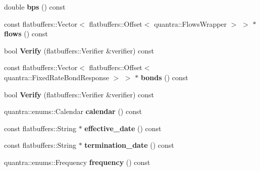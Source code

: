 \begin{DoxyCompactItemize}
double {\bfseries bps} () const
\item 
\mbox{\label{structquantra_1_1FLATBUFFERS__FINAL__CLASS_aadf140966c400eb42ab77cc5049538a0}} 
const flatbuffers\+::\+Vector$<$ flatbuffers\+::\+Offset$<$ quantra\+::\+Flows\+Wrapper $>$ $>$ $\ast$ {\bfseries flows} () const
\item 
\mbox{\label{structquantra_1_1FLATBUFFERS__FINAL__CLASS_aed693ee5a45b5f53af7411f9cab6793a}} 
bool {\bfseries Verify} (flatbuffers\+::\+Verifier \&verifier) const
\item 
\mbox{\label{structquantra_1_1FLATBUFFERS__FINAL__CLASS_a12e5ea116142db128ca4e889ac5c752b}} 
const flatbuffers\+::\+Vector$<$ flatbuffers\+::\+Offset$<$ quantra\+::\+Fixed\+Rate\+Bond\+Response $>$ $>$ $\ast$ {\bfseries bonds} () const
\item 
\mbox{\label{structquantra_1_1FLATBUFFERS__FINAL__CLASS_aed693ee5a45b5f53af7411f9cab6793a}} 
bool {\bfseries Verify} (flatbuffers\+::\+Verifier \&verifier) const
\item 
\mbox{\label{structquantra_1_1FLATBUFFERS__FINAL__CLASS_a22bef2961bc16a42406e7b6c3d62a33e}} 
quantra\+::enums\+::\+Calendar {\bfseries calendar} () const
\item 
\mbox{\label{structquantra_1_1FLATBUFFERS__FINAL__CLASS_a122143580b74bd04c6b38d31044c9836}} 
const flatbuffers\+::\+String $\ast$ {\bfseries effective\+\_\+date} () const
\item 
\mbox{\label{structquantra_1_1FLATBUFFERS__FINAL__CLASS_a20d35ff63f6504b8c480e7495c92f4c0}} 
const flatbuffers\+::\+String $\ast$ {\bfseries termination\+\_\+date} () const
\item 
\mbox{\label{structquantra_1_1FLATBUFFERS__FINAL__CLASS_a56f742df0ea6d251577d672eb4ae1a00}} 
quantra\+::enums\+::\+Frequency {\bfseries frequency} () const
\item 

\end{DoxyCompactItemize}
